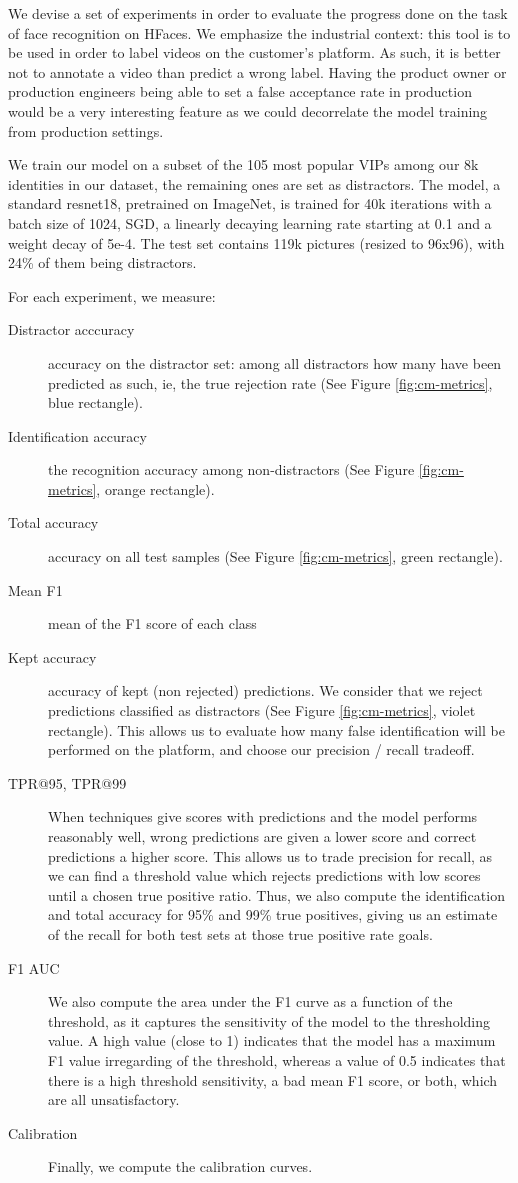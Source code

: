 We devise a set of experiments in order to evaluate the progress done on the task of face recognition on HFaces. We emphasize the industrial context: this tool is to be used in order to label videos on the customer's platform. As such, it is better not to annotate a video than predict a wrong label. Having the product owner or production engineers being able to set a false acceptance rate in production would be a very interesting feature as we could decorrelate the model training from production settings.

We train our model on a subset of the 105 most popular VIPs among our 8k identities in our dataset, the remaining ones are set as distractors. The model, a standard resnet18, pretrained on ImageNet, is trained for 40k iterations with a batch size of 1024, SGD, a linearly decaying learning rate starting at 0.1 and a weight decay of 5e-4. The test set contains 119k pictures (resized to 96x96), with 24\% of them being distractors.

For each experiment, we measure:
\begin{description}
    \item[Distractor acccuracy] accuracy on the distractor set: among all distractors how many have been predicted as such, ie, the true rejection rate (See Figure \ref{fig:cm-metrics}, blue rectangle).
    \item[Identification accuracy] the recognition accuracy among non-distractors (See Figure \ref{fig:cm-metrics}, orange rectangle).
    \item[Total accuracy] accuracy on all test samples (See Figure \ref{fig:cm-metrics}, green rectangle).
    \item[Mean F1] mean of the F1 score of each class
    \item[Kept accuracy] accuracy of kept (non rejected) predictions. We consider that we reject predictions classified as distractors (See Figure \ref{fig:cm-metrics}, violet rectangle). This allows us to evaluate how many false identification will be performed on the platform, and choose our precision / recall tradeoff.
    \item[\ac{TPR}@95, \ac{TPR}@99] When techniques give scores with predictions and the model performs reasonably well, wrong predictions are given a lower score and correct predictions a higher score. This allows us to trade precision for recall, as we can find a threshold value which rejects predictions with low scores until a chosen true positive ratio. Thus, we also compute the identification and total accuracy for 95\% and 99\% true positives, giving us an estimate of the recall for both test sets at those true positive rate goals.
    \item[F1 \ac{AUC}] We also compute the area under the F1 curve as a function of the threshold, as it captures the sensitivity of the model to the thresholding value. A high value (close to 1) indicates that the model has a maximum F1 value irregarding of the threshold, whereas a value of 0.5 indicates that there is a high threshold sensitivity, a bad mean F1 score, or both, which are all unsatisfactory.
    \item[Calibration] Finally, we compute the calibration curves.
\end{description}

